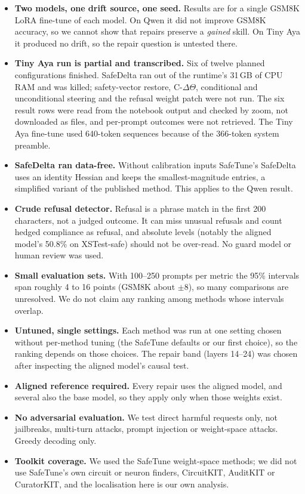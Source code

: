 \label{sec:limits}
\begin{itemize}
\item \textbf{Two models, one drift source, one seed.} Results are for a single GSM8K LoRA fine-tune of each model. On Qwen it did not improve GSM8K accuracy, so we cannot show that repairs preserve a \emph{gained} skill. On Tiny Aya it produced no drift, so the repair question is untested there.
\item \textbf{Tiny Aya run is partial and transcribed.} Six of twelve planned configurations finished. SafeDelta ran out of the runtime's 31\,GB of CPU RAM and was killed; safety-vector restore, C-$\Delta\Theta$, conditional and unconditional steering and the refusal weight patch were not run. The six result rows were read from the notebook output and checked by zoom, not downloaded as files, and per-prompt outcomes were not retrieved. The Tiny Aya fine-tune used 640-token sequences because of the 366-token system preamble.
\item \textbf{SafeDelta ran data-free.} Without calibration inputs SafeTune's SafeDelta uses an identity Hessian and keeps the smallest-magnitude entries, a simplified variant of the published method. This applies to the Qwen result.
\item \textbf{Crude refusal detector.} Refusal is a phrase match in the first 200 characters, not a judged outcome. It can miss unusual refusals and count hedged compliance as refusal, and absolute levels (notably the aligned model's 50.8\% on XSTest-safe) should not be over-read. No guard model or human review was used.
\item \textbf{Small evaluation sets.} With 100--250 prompts per metric the 95\% intervals span roughly 4 to 16 points (GSM8K about $\pm$8), so many comparisons are unresolved. We do not claim any ranking among methods whose intervals overlap.
\item \textbf{Untuned, single settings.} Each method was run at one setting chosen without per-method tuning (the SafeTune defaults or our first choice), so the ranking depends on those choices. The repair band (layers 14--24) was chosen after inspecting the aligned model's causal test.
\item \textbf{Aligned reference required.} Every repair uses the aligned model, and several also the base model, so they apply only when those weights exist.
\item \textbf{No adversarial evaluation.} We test direct harmful requests only, not jailbreaks, multi-turn attacks, prompt injection or weight-space attacks. Greedy decoding only.
\item \textbf{Toolkit coverage.} We used the SafeTune weight-space methods; we did not use SafeTune's own circuit or neuron finders, CircuitKIT, AuditKIT or CuratorKIT, and the localisation here is our own analysis.
\end{itemize}
